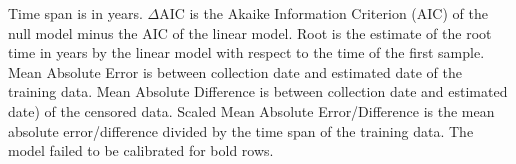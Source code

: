 \documentclass[12pt]{article}
\begin{document}
\begin{sidewaystable}
	Time span is in years.
	$\Delta$AIC is the Akaike Information Criterion (AIC) \cite{Akaike74} of the null model minus the AIC of the linear model.
	Root is the estimate of the root time in years by the linear model with respect to the time of the first sample.
	Mean Absolute Error is between collection date and estimated date of the training data.
	Mean Absolute Difference is between collection date and estimated date) of the censored data.
	Scaled Mean Absolute Error/Difference is the mean absolute error/difference divided by the time span of the training data.
	The model failed to be calibrated for bold rows.
\end{sidewaystable}

\pagebreak{}



\end{document}
